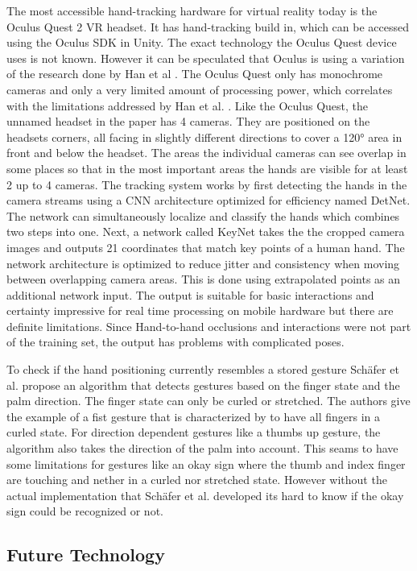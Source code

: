 The most accessible hand-tracking hardware for virtual reality today is
the Oculus Quest 2 VR headset. It has hand-tracking build in, which can
be accessed using the Oculus SDK in Unity. The exact technology the
Oculus Quest device uses is not known. However it can be speculated that
Oculus is using a variation of the research done by Han et al \cite{Han}. The
Oculus Quest only has monochrome cameras and only a very limited amount
of processing power, which correlates with the limitations addressed by
Han et al. \cite{Han}. Like the Oculus Quest, the
unnamed headset in the paper has 4 cameras. They are positioned on the
headsets corners, all facing in slightly different directions to cover a
120° area in front and below the headset. The areas the individual
cameras can see overlap in some places so that in the most important
areas the hands are visible for at least 2 up to 4 cameras. The
tracking system works by first detecting the hands in the camera streams
using a CNN architecture optimized for efficiency named DetNet. The
network can simultaneously localize and classify the hands which
combines two steps into one. Next, a network called KeyNet takes the the
cropped camera images and outputs 21 coordinates that match key points
of a human hand. The network architecture is optimized to reduce jitter
and consistency when moving between overlapping camera areas. This is
done using extrapolated points as an additional network input. The
output is suitable for basic interactions and certainty impressive for
real time processing on mobile hardware but there are definite
limitations. Since Hand-to-hand occlusions and interactions were not
part of the training set, the output has problems with complicated
poses.

To check if the hand positioning currently resembles a stored gesture Schäfer et al. \cite{Schafer2021} propose an algorithm that detects gestures based on the finger state and the palm direction. The finger state can only be curled or stretched. The authors give the example of a fist gesture that is characterized by to have all fingers in a curled state. For direction dependent gestures like a thumbs up gesture, the algorithm also takes the direction of the palm into account. This seams to have some limitations for gestures like an okay sign where the thumb and index finger are touching and nether in a curled nor stretched state. However without the actual implementation that Schäfer et al. developed its hard to know if the okay sign could be recognized or not.

\subsection{Future Technology}\label{future-technology}

